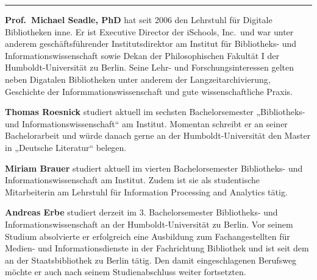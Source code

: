 \begin{center}\rule{0.5\linewidth}{\linethickness}\end{center}

\textbf{Prof.~Michael Seadle, PhD} hat seit 2006 den Lehrstuhl für
Digitale Bibliotheken inne. Er ist Executive Director der iSchools,
Inc.~und war unter anderem geschäftsführender Institutsdirektor am
Institut für Bibliotheks- und Informationswissenschaft sowie Dekan der
Philosophischen Fakultät I der Humboldt-Universität zu Berlin. Seine
Lehr- und Forschungsinteressen gelten neben Digatalen Bibliotheken unter
anderem der Langzeitarchivierung, Geschichte der
Informmationswissenschaft und gute wissenschaftliche Praxis.

\textbf{Thomas Roesnick} studiert aktuell im sechsten Bachelorsemester
„Bibliotheks- und Informationswissenschaft`` am Institut. Momentan
schreibt er an seiner Bachelorarbeit und würde danach gerne an der
Humboldt-Universität den Master in „Deutsche Literatur`` belegen.

\textbf{Miriam Brauer} studiert aktuell im vierten Bachelorsemester
Bibliotheks- und Informationswissenschaft am Institut. Zudem ist sie als
studentische Mitarbeiterin am Lehrstuhl für Information Processing and
Analytics tätig.

\textbf{Andreas Erbe} studiert derzeit im 3. Bachelorsemester
Bibliotheks- und Informationswissenschaft an der Humboldt-Universität zu
Berlin. Vor seinem Studium absolvierte er erfolgreich eine Ausbildung
zum Fachangestellten für Medien- und Informationsdienste in der
Fachrichtung Bibliothek und ist seit dem an der Staatsbibliothek zu
Berlin tätig. Den damit eingeschlagenen Berufsweg möchte er auch nach
seinem Studienabschluss weiter fortsetzten.
